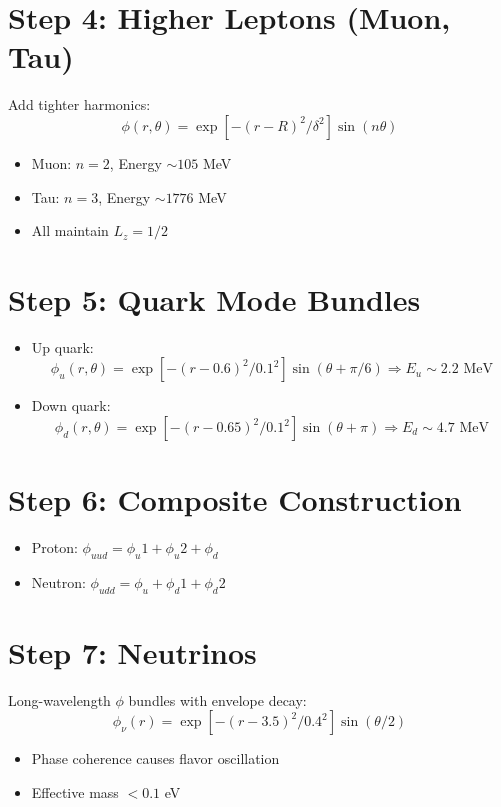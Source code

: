 \documentclass[12pt]{article}
\begin{document}
\section*{Step 4: Higher Leptons (Muon, Tau)}
Add tighter harmonics:
\[
\phi(r, \theta) = \exp[-(r - R)^2 / \delta^2] \sin(n \theta)
\]
\begin{itemize}
\item Muon: $n = 2$, Energy $\sim 105$ MeV
\item Tau: $n = 3$, Energy $\sim 1776$ MeV
\item All maintain $L_z = 1/2$
\end{itemize}

\section*{Step 5: Quark Mode Bundles}
\begin{itemize}
\item Up quark:
\[
\phi_u(r, \theta) = \exp[-(r - 0.6)^2 / 0.1^2] \sin(\theta + \pi/6) \Rightarrow E_u \sim 2.2 \text{ MeV}
\]
\item Down quark:
\[
\phi_d(r, \theta) = \exp[-(r - 0.65)^2 / 0.1^2] \sin(\theta + \pi) \Rightarrow E_d \sim 4.7 \text{ MeV}
\]
\end{itemize}

\section*{Step 6: Composite Construction}
\begin{itemize}
\item Proton: $\phi_{uud} = \phi_u1 + \phi_u2 + \phi_d$
\item Neutron: $\phi_{udd} = \phi_u + \phi_d1 + \phi_d2$
\end{itemize}

\section*{Step 7: Neutrinos}
Long-wavelength $\phi$ bundles with envelope decay:
\[
\phi_{\nu}(r) = \exp[-(r - 3.5)^2 / 0.4^2] \sin(\theta / 2)
\]
\begin{itemize}
\item Phase coherence causes flavor oscillation
\item Effective mass $< 0.1$ eV
\end{itemize}
\end{document}
